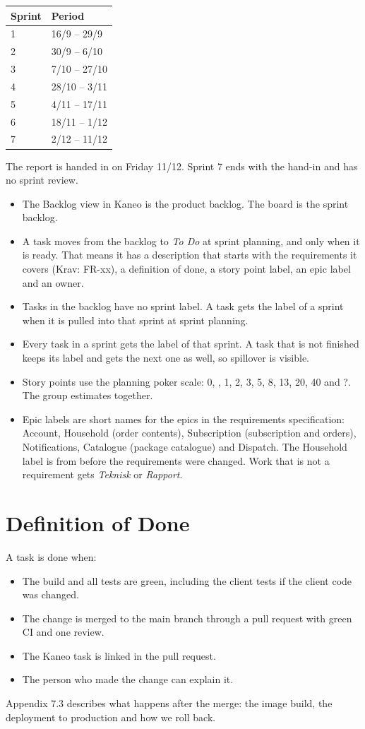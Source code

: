 \documentclass[a4paper,11pt]{article}
\begin{document}
\begin{center}
\begin{tabular}{@{}ll@{}}
Sprint & Period \\ \hline
1 & 16/9 -- 29/9 \\
2 & 30/9 -- 6/10 \\
3 & 7/10 -- 27/10 \\
4 & 28/10 -- 3/11 \\
5 & 4/11 -- 17/11 \\
6 & 18/11 -- 1/12 \\
7 & 2/12 -- 11/12 \\
\end{tabular}
\end{center}

The report is handed in on Friday 11/12. Sprint 7 ends with the hand-in and has no sprint review.

\begin{itemize}
    \item The Backlog view in Kaneo is the product backlog. The board is the sprint backlog.
    \item A task moves from the backlog to \emph{To Do} at sprint planning, and only when it is ready. That means it has a description that starts with the requirements it covers (Krav: FR-xx), a definition of done, a story point label, an epic label and an owner.
    \item Tasks in the backlog have no sprint label. A task gets the label of a sprint when it is pulled into that sprint at sprint planning.
    \item Every task in a sprint gets the label of that sprint. A task that is not finished keeps its label and gets the next one as well, so spillover is visible.
    \item Story points use the planning poker scale: 0, \textonehalf, 1, 2, 3, 5, 8, 13, 20, 40 and ?. The group estimates together.
    \item Epic labels are short names for the epics in the requirements specification: Account, Household (order contents), Subscription (subscription and orders), Notifications, Catalogue (package catalogue) and Dispatch. The Household label is from before the requirements were changed. Work that is not a requirement gets \emph{Teknisk} or \emph{Rapport}.
\end{itemize}

\section{Definition of Done}
A task is done when:
\begin{itemize}
    \item The build and all tests are green, including the client tests if the client code was changed.
    \item The change is merged to the main branch through a pull request with green CI and one review.
    \item The Kaneo task is linked in the pull request.
    \item The person who made the change can explain it.
\end{itemize}

Appendix 7.3 describes what happens after the merge: the image build, the deployment to production and how we roll back.
\end{document}
